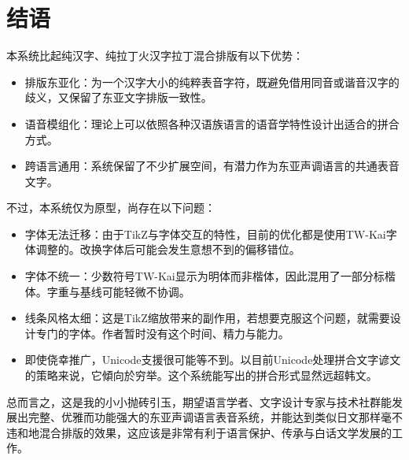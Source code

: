 \section{结语}
本系统比起纯汉字、纯拉丁火汉字拉丁混合排版有以下优势：\par
\begin{itemize}
	\item 排版东亚化：为一个汉字大小的纯粹表音字符，既避免借用同音或谐音汉字的歧义，又保留了东亚文字排版一致性。
	\item 语音模组化：理论上可以依照各种汉语族语言的语音学特性设计出适合的拼合方式。
	\item 跨语言通用：系统保留了不少扩展空间，有潜力作为东亚声调语言的共通表音文字。
\end{itemize}
不过，本系统仅为原型，尚存在以下问题：
\begin{itemize}
	\item 字体无法迁移：由于TikZ与字体交互的特性，目前的优化都是使用TW-Kai字体调整的。改换字体后可能会发生意想不到的偏移错位。
	\item 字体不统一：少数符号TW-Kai显示为明体而非楷体，因此混用了一部分标楷体。字重与基线可能轻微不协调。
	\item 线条风格太细：这是TikZ缩放带来的副作用，若想要克服这个问题，就需要设计专门的字体。作者暂时没有这个时间、精力与能力。
	\item 即使侥幸推广，Unicode支援很可能等不到。以目前Unicode处理拼合文字谚文的策略来说，它傾向於穷举。这个系统能写出的拼合形式显然远超韩文。
\end{itemize}
总而言之，这是我的小小抛砖引玉，期望语言学者、文字设计专家与技术社群能发展出完整、优雅而功能强大的东亚声调语言表音系统，并能达到类似日文那样毫不违和地混合排版的效果，这应该是非常有利于语言保护、传承与白话文学发展的工作。
\clearpage